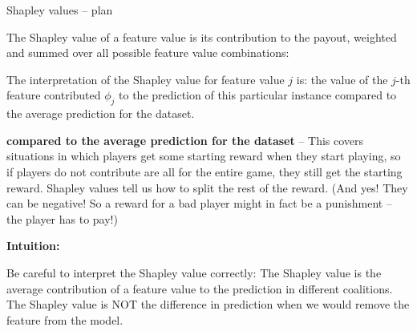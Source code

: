\documentclass[aspectratio=169,handout]{beamer} %
\begin{document}
\begin{frame}{Shapley values -- plan}

The Shapley value of a feature value is its contribution to the payout, weighted and summed over all possible feature value combinations:

The interpretation of the Shapley value for feature value $j$ is: the value of the $j$-th feature contributed $\phi_j$ to the prediction of this particular instance compared to the average prediction for the dataset.

\textbf{compared to the average prediction for the dataset} -- This covers situations in which players get some starting reward when they start playing, so if players do not contribute are all for the entire game, they still get the starting reward. Shapley values tell us how to split the rest of the reward. (And yes! They can be negative! So a reward for a bad player might in fact be a punishment -- the player has to pay!)

\textbf{Intuition:}


Be careful to interpret the Shapley value correctly: The Shapley value is the average contribution of a feature value to the prediction in different coalitions. The Shapley value is NOT the difference in prediction when we would remove the feature from the model.

\end{frame}
\end{document}
